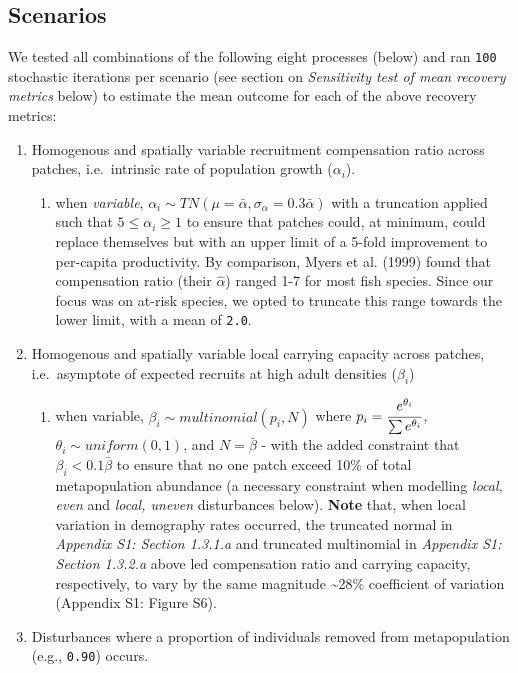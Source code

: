 \documentclass[
]{article}
\providecommand{\tightlist}{%
  \setlength{\itemsep}{0pt}\setlength{\parskip}{0pt}}
\begin{document}
\hypertarget{scenarios}{%
\subsection{Scenarios}\label{scenarios}}

We tested all combinations of the following eight processes (below) and
ran \texttt{100} stochastic iterations per scenario (see section on
\emph{Sensitivity test of mean recovery metrics} below) to estimate the
mean outcome for each of the above recovery metrics:

\begin{enumerate}
\def\labelenumi{\arabic{enumi}.}
\item
  Homogenous and spatially variable recruitment compensation ratio
  across patches, i.e.~intrinsic rate of population growth
  (\(\alpha_i\)).

  \begin{enumerate}
  \def\labelenumii{\alph{enumii}.}
  \tightlist
  \item
    when \emph{variable},
    \(\alpha_i \sim TN(\mu=\bar{\alpha}, \sigma_{\alpha}=0.3\bar{\alpha})\)
    with a truncation applied such that \(5 \leq \alpha_i \geq 1\) to
    ensure that patches could, at minimum, could replace themselves but
    with an upper limit of a 5-fold improvement to per-capita
    productivity. By comparison, Myers et al. (1999) found that
    compensation ratio (their \(\hat\alpha\)) ranged 1-7 for most fish
    species. Since our focus was on at-risk species, we opted to
    truncate this range towards the lower limit, with a mean of
    \texttt{2.0}.
  \end{enumerate}
\item
  Homogenous and spatially variable local carrying capacity across
  patches, i.e.~asymptote of expected recruits at high adult densities
  (\(\beta_i\))

  \begin{enumerate}
  \def\labelenumii{\alph{enumii}.}
  \tightlist
  \item
    when variable, \(\beta_i \sim multinomial(p_i,N)\) where
    \(p_i=\cfrac{e^{\theta_i}}{ \sum{e^{\theta_i}}}\),
    \(\theta_i \sim uniform(0,1)\), and \(N=\bar{\beta}\) - with the
    added constraint that \(\beta_i<0.1\bar{\beta}\) to ensure that no
    one patch exceed 10\% of total metapopulation abundance (a necessary
    constraint when modelling \emph{local, even} and \emph{local,
    uneven} disturbances below). \textbf{Note} that, when local
    variation in demography rates occurred, the truncated normal in
    \emph{Appendix S1: Section 1.3.1.a} and truncated multinomial in
    \emph{Appendix S1: Section 1.3.2.a} above led compensation ratio and
    carrying capacity, respectively, to vary by the same magnitude
    \textasciitilde28\% coefficient of variation (Appendix S1: Figure
    S6).
  \end{enumerate}
\item
  Disturbances where a proportion of individuals removed from
  metapopulation (e.g., \texttt{0.90}) occurs.


\end{enumerate}
\end{document}
